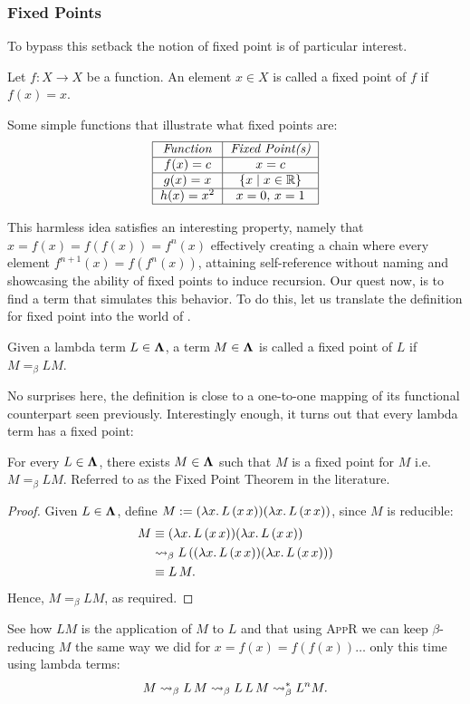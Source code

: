 \subsubsection{\centering Fixed Points}
To bypass this setback the notion of fixed point is of particular interest.
\begin{definition}
  Let \( f : X \to X \) be a function. An element \( x \in X \) is called a fixed point of \( f \) if \( f(x) = x. \)
\end{definition}
\begin{example} Some simple functions that illustrate what fixed points are:
  \[
    \begin{tabular}{|c|c|}
      \hline
      \textit{Function} & \textit{Fixed Point(s)} \\
      \hline
      $f(x) = c$ & $x = c$ \\
      \hline
      $g(x) = x$ & $\{ x \mid x \in \mathbb{R} \}$ \\
      \hline
      $h(x) = x^2$ & $ x = 0,\, x = 1 $ \\
      \hline
    \end{tabular}
  \]
\end{example}
This harmless idea satisfies an interesting property, namely that $ x = f(x) = f(f(x)) = f^n(x) $ effectively creating a chain where every element $ f^{n+1}(x) = f(f^{n}(x))$, attaining self-reference without naming and showcasing the ability of fixed points to induce recursion. Our quest now, is to find a term that simulates this behavior. To do this, let us translate the definition for fixed point into the world of \lcalc.
\begin{definition}
  Given a lambda term \( L \in \mathbf{\Lambda} \), a term \( M \in \mathbf{\Lambda} \) is called a fixed point of \( L \) if \( M =_\beta L M \).
\end{definition}
No surprises here, the definition is close to a one-to-one mapping of its functional counterpart seen previously. Interestingly enough, it turns out that every lambda term has a fixed point:
\begin{theorem}
  For every \( L \in \mathbf{\Lambda} \), there exists \( M \in \mathbf{\Lambda} \) such that $ M $ is a fixed point for $ M $ i.e. $ M =_\beta L M $. Referred to as the Fixed Point Theorem in the literature.
\end{theorem}
\begin{proof} Given $L \in \mathbf{\Lambda}$, define
  \(
    M := (\lambda x . \, L \, (x \, x))(\lambda x . \, L \, (x \, x))
  \),
  since $M$ is reducible:
  \begin{align*}
    M 
    &\equiv (\lambda x . \, L \, (x \, x))(\lambda x . \, L \, (x \, x)) \\
    &\mathrel{\leadsto}_\beta L \, ((\lambda x . \, L \, (x \, x))(\lambda x . \, L\, (x \, x))) \\
    &\equiv L \, M.
  \end{align*}
  Hence, $ M =_\beta L M $, as required.
\end{proof}
\begin{remark}
  See how $ L M $ is the application of $ M $ to $ L $ and that using \textsc{AppR} we can keep $\beta$-reducing $ M $ the same way we did for $ x = f(x) = f(f(x))\dots $ only this time using lambda terms:
  \[
    M \mathrel{\leadsto}_\beta L \, M \mathrel{\leadsto}_\beta L \, L \, M \mathrel{\leadsto}_\beta^* L^n M.
  \]
\end{remark}
